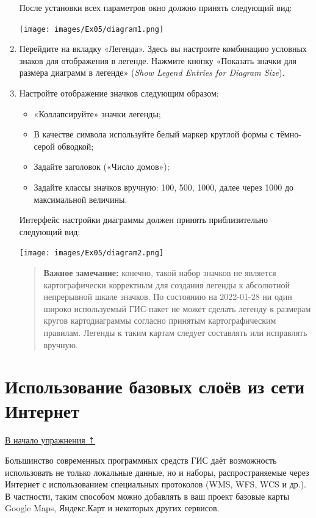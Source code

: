 \documentclass[
  12pt,
]{book}
\providecommand{\tightlist}{%
  \setlength{\itemsep}{0pt}\setlength{\parskip}{0pt}}
\begin{document}
\begin{enumerate}
  После установки всех параметров окно должно принять следующий вид:

  \texttt{[image: images/Ex05/diagram1.png]}
\item
  Перейдите на вкладку «Легенда». Здесь вы настроите комбинацию условных знаков для отображения в легенде. Нажмите кнопку «Показать значки для размера диаграмм в легенде» (\emph{Show Legend Entries for Diagram Size}).
\item
  Настройте отображение значков следующим образом:

  \begin{itemize}
  \tightlist
  \item
    «Коллапсируйте» значки легенды;
  \item
    В качестве символа используйте белый маркер круглой формы с тёмно-серой обводкой;
  \item
    Задайте заголовок («Число домов»);
  \item
    Задайте классы значков вручную: 100, 500, 1000, далее через 1000 до максимальной величины.
  \end{itemize}

  Интерфейс настройки диаграммы должен принять приблизительно следующий вид:

  \texttt{[image: images/Ex05/diagram2.png]}

  \begin{quote}
  \textbf{Важное замечание:} конечно, такой набор значков не является картографически корректным для создания легенды к абсолютной непрерывной шкале значков. По состоянию на 2022-01-28 ни один широко используемый ГИС-пакет не может сделать легенду к размерам кругов картодиаграммы согласно принятым картографическим правилам. Легенды к таким картам следует составлять или исправлять вручную.
  \end{quote}
\end{enumerate}

\hypertarget{map-ref-districts-wms}{%
\section{Использование базовых слоёв из сети Интернет}\label{map-ref-districts-wms}}

\protect\hyperlink{map-ref-districts}{В начало упражнения ⇡}

Большинство современных программных средств ГИС даёт возможность использовать не только локальные данные, но и наборы, распространяемые через Интернет с использованием специальных протоколов (WMS, WFS, WCS и др.). В частности, таким способом можно добавлять в ваш проект базовые карты Google Maps, Яндекс.Карт и некоторых других сервисов.
\end{document}
